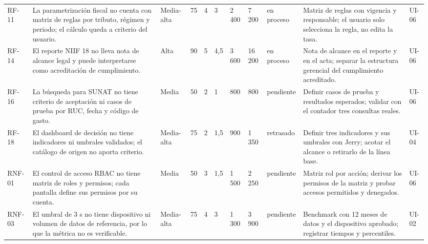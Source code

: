 \begin{landscape}
{\begin{longtable}{L{2.2cm} L{4.0cm} L{1.6cm} L{1.0cm} L{1.1cm} L{1.3cm} L{1.3cm} L{2.5cm} L{1.6cm} L{4.8cm} L{1.6cm}}
RF-11 & La parametrización fiscal no cuenta con matriz de reglas por tributo, régimen y periodo; el cálculo queda a criterio del usuario. & Media-alta & 75 & 4 & 3 & 2\,400 & 7\,200 & en proceso & Matriz de reglas con vigencia y responsable; el usuario solo selecciona la regla, no edita la tasa. & UI-06 \\
RF-14 & El reporte NIIF 18 no lleva nota de alcance legal y puede interpretarse como acreditación de cumplimiento. & Alta & 90 & 5 & 4,5 & 3\,600 & 16\,200 & en proceso & Nota de alcance en el reporte y en el acta; separar la estructura gerencial del cumplimiento acreditado. & UI-06 \\
RF-16 & La búsqueda para SUNAT no tiene criterio de aceptación ni casos de prueba por RUC, fecha y código de gasto. & Media & 50 & 2 & 1 & 800 & 800 & pendiente & Definir casos de prueba y resultados esperados; validar con el contador tres consultas reales. & UI-06 \\
RF-18 & El dashboard de decisión no tiene indicadores ni umbrales validados; el catálogo de origen no aporta criterio. & Media-alta & 75 & 2 & 1,5 & 900 & 1\,350 & retrasado & Definir tres indicadores y sus umbrales con Jerry; acotar el alcance o retirarlo de la línea base. & UI-04 \\
RNF-01 & El control de acceso RBAC no tiene matriz de roles y permisos; cada pantalla define sus permisos por su cuenta. & Media & 50 & 3 & 1,5 & 1\,500 & 2\,250 & pendiente & Matriz rol por acción; derivar los permisos de la matriz y probar accesos permitidos y denegados. & UI-06 \\
RNF-03 & El umbral de 3 s no tiene dispositivo ni volumen de datos de referencia, por lo que la métrica no es verificable. & Media-alta & 75 & 4 & 3 & 1\,300 & 3\,900 & pendiente & Benchmark con 12 meses de datos y el dispositivo aprobado; registrar tiempos y percentiles. & UI-02 \\
\end{longtable}
}
\end{landscape}
